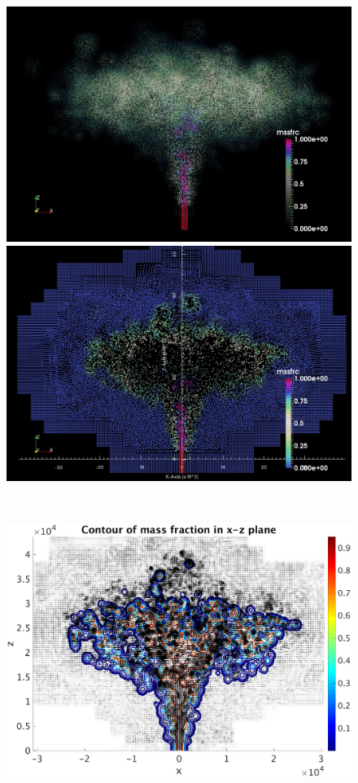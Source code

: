 \documentclass[gmd, manuscript]{copernicus}
\begin{document}
\begin{figure}[!htb]
    \centering
    \begin{minipage}{.45\textwidth}
        \centering
        \includegraphics[width=0.99 \textwidth]{./mssfrc-Diverging}
    \end{minipage}%
    \begin{minipage}{.45 \textwidth}
        \centering
        \includegraphics[width=0.99 \textwidth]{./mssfrc-Diverging-cut}
    \end{minipage}%
    \\
    \begin{minipage}{.45 \textwidth}
        \centering
        \includegraphics[width=0.99 \textwidth]{./gmd-mssfrc-xz}

\end{minipage}
\end{figure}
\end{document}
